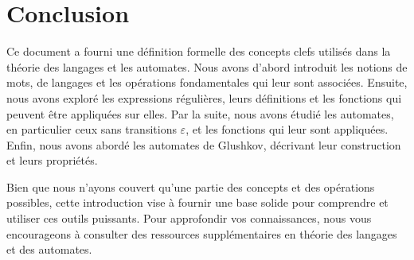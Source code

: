 \section{Conclusion}

Ce document a fourni une définition formelle des concepts clefs utilisés dans
la théorie des langages et les automates. Nous avons d'abord introduit les
notions de mots, de langages et les opérations fondamentales qui leur sont
associées. Ensuite, nous avons exploré les expressions régulières, leurs
définitions et les fonctions qui peuvent être appliquées sur elles. Par la
suite, nous avons étudié les automates, en particulier ceux sans transitions
\(\varepsilon\), et les fonctions qui leur sont appliquées. Enfin, nous avons
abordé les automates de Glushkov, décrivant leur construction et leurs
propriétés.

\vphantom{}

Bien que nous n'ayons couvert qu'une partie des concepts et des opérations
possibles, cette introduction vise à fournir une base solide pour comprendre et
utiliser ces outils puissants. Pour approfondir vos connaissances, nous vous
encourageons à consulter des ressources supplémentaires en théorie des langages
et des automates.
